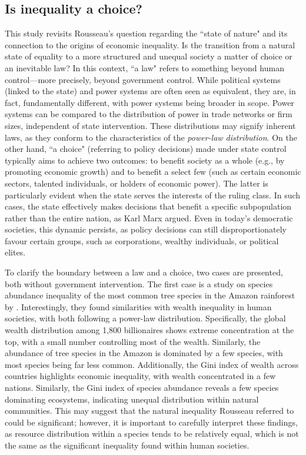 \subsection{Is inequality a choice?}
This study revisits Rousseau's question regarding the ``state of nature" and its connection to the origins of economic inequality. Is the transition from a natural state of equality to a more structured and unequal society a matter of choice or an inevitable law? In this context, ``a law" refers to something beyond human control—more precisely, beyond government control. While political systems (linked to the state) and power systems are often seen as equivalent, they are, in fact, fundamentally different, with power systems being broader in scope. Power systems can be compared to the distribution of power in trade networks or firm sizes, independent of state intervention. These distributions may signify inherent laws, as they conform to the characteristics of the \textit{power-law distribution}. On the other hand, ``a choice" (referring to policy decisions) made under state control typically aims to achieve two outcomes: to benefit society as a whole (e.g., by promoting economic growth) and to benefit a select few (such as certain economic sectors, talented individuals, or holders of economic power). The latter is particularly evident when the state serves the interests of the ruling class. In such cases, the state effectively makes decisions that benefit a specific subpopulation rather than the entire nation, as Karl Marx argued. Even in today's democratic societies, this dynamic persists, as policy decisions can still disproportionately favour certain groups, such as corporations, wealthy individuals, or political elites.

To clarify the boundary between a law and a choice, two cases are presented, both without government intervention. The first case is a study on species abundance inequality of the most common tree species in the Amazon rainforest by \textcite{scheffer2017inequality}. Interestingly, they found similarities with wealth inequality in human societies, with both following a power-law distribution. Specifically, the global wealth distribution among 1,800 billionaires shows extreme concentration at the top, with a small number controlling most of the wealth. Similarly, the abundance of tree species in the Amazon is dominated by a few species, with most species being far less common. Additionally, the Gini index of wealth across countries highlights economic inequality, with wealth concentrated in a few nations. Similarly, the Gini index of species abundance reveals a few species dominating ecosystems, indicating unequal distribution within natural communities. This may suggest that the natural inequality Rousseau referred to could be significant; however, it is important to carefully interpret these findings, as resource distribution within a species tends to be relatively equal, which is not the same as the significant inequality found within human societies. 

